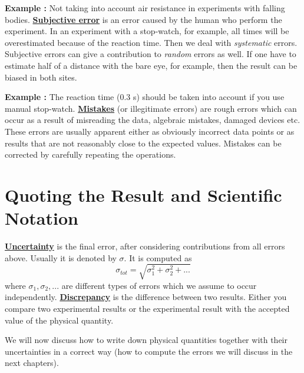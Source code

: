 \documentclass[12pt,a4paper]{article}
\newcommand{\definition}[1]{ \textcolor{MyRed}{\uline{\textbf {#1}}}}%
\newcommand{\example}[1]{\textcolor{MyBlue}{\textbf{Example {#1}: }}}
\begin{document}
\example {} Not taking into account air resistance in experiments with falling bodies.
\newline
\newline
\definition{Subjective error} is an error caused by the human who perform the experiment.  In an experiment with a stop-watch, for example, all times will be overestimated because of the reaction time. Then we deal with \textit{systematic} errors. Subjective errors can give a contribution to \textit{random} errors as well. If one have to estimate half of a distance  with the bare eye, for example, then the result can be biased in both sites.

\example{} The reaction time (0.3 s) should be taken into account if you use manual stop-watch. 
\newline
\newline
\definition{Mistakes} (or illegitimate errors) are rough errors which can occur as a result of misreading the data, algebraic mistakes, damaged devices etc. These errors are usually apparent either as obviously incorrect data points or as results that are not reasonably close to the expected values. Mistakes can be corrected by carefully repeating the operations.

\section{Quoting the Result and Scientific Notation}
\definition{Uncertainty} is the final error, after considering contributions from all errors above. Usually it is denoted by $\sigma$. It is computed as
\begin{equation} \label{sigma_tot}
\boxed{\sigma_{tot} = \sqrt{\sigma_1^2+\sigma_2^2 + ...}}
\end{equation}
where $\sigma_1, \sigma_2, ...$ are different types of errors which we assume to occur independently.
\newline
\newline
\definition{Discrepancy} is the difference between two results. Either you compare two experimental results or the experimental result with the accepted value of the physical quantity.

We will now discuss how to write down physical quantities together with their uncertainties in a correct way (how to compute the errors we will discuss in the next chapters).
\end{document}

